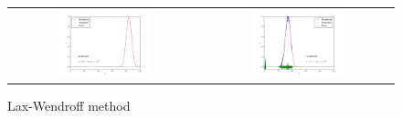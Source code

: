 \documentclass[11pt,letterpaper]{article}
\begin{document}
\begin{figure}
\centering
\begin{tabular}{cc}
    \includegraphics[width={0.49\textwidth}]{fig12.pdf} &
    \includegraphics[width={0.49\textwidth}]{fig13.pdf} \\
\end{tabular}
\caption{Lax-Wendroff method}
\label{fig5}
\end{figure}
\end{document}
